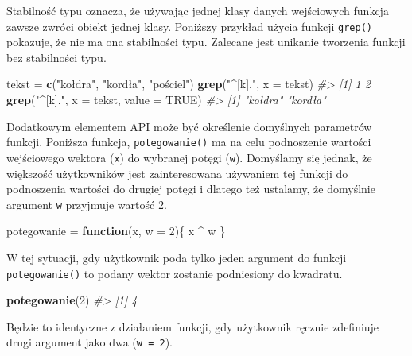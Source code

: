 \documentclass[paper=6in:9in,pagesize=pdftex,headinclude=on,footinclude=on,10pt]{scrbook}
\newenvironment{Shaded}{\begin{snugshade}}{\end{snugshade}}
\newcommand{\CommentTok}[1]{\textcolor[rgb]{0.56,0.35,0.01}{\textit{#1}}}
\newcommand{\ControlFlowTok}[1]{\textcolor[rgb]{0.13,0.29,0.53}{\textbf{#1}}}
\newcommand{\DataTypeTok}[1]{\textcolor[rgb]{0.13,0.29,0.53}{#1}}
\newcommand{\DecValTok}[1]{\textcolor[rgb]{0.00,0.00,0.81}{#1}}
\newcommand{\KeywordTok}[1]{\textcolor[rgb]{0.13,0.29,0.53}{\textbf{#1}}}
\newcommand{\NormalTok}[1]{#1}
\newcommand{\OperatorTok}[1]{\textcolor[rgb]{0.81,0.36,0.00}{\textbf{#1}}}
\newcommand{\OtherTok}[1]{\textcolor[rgb]{0.56,0.35,0.01}{#1}}
\newcommand{\StringTok}[1]{\textcolor[rgb]{0.31,0.60,0.02}{#1}}
\begin{document}
Stabilność typu oznacza, że używając jednej klasy danych wejściowych funkcja zawsze zwróci obiekt jednej klasy.
Poniższy przykład użycia funkcji \texttt{grep()} pokazuje, że nie ma ona stabilności typu.
Zalecane jest unikanie tworzenia funkcji bez stabilności typu.

\begin{Shaded}
\begin{Highlighting}[]
\NormalTok{tekst =}\StringTok{ }\KeywordTok{c}\NormalTok{(}\StringTok{"kołdra"}\NormalTok{, }\StringTok{"kordła"}\NormalTok{, }\StringTok{"pościel"}\NormalTok{)}
\KeywordTok{grep}\NormalTok{(}\StringTok{"^[k]."}\NormalTok{, }\DataTypeTok{x =}\NormalTok{ tekst)}
\CommentTok{#> [1] 1 2}
\KeywordTok{grep}\NormalTok{(}\StringTok{"^[k]."}\NormalTok{, }\DataTypeTok{x =}\NormalTok{ tekst, }\DataTypeTok{value =} \OtherTok{TRUE}\NormalTok{)}
\CommentTok{#> [1] "kołdra" "kordła"}
\end{Highlighting}
\end{Shaded}

Dodatkowym elementem API może być określenie domyślnych parametrów funkcji.
Poniższa funkcja, \texttt{potegowanie()} ma na celu podnoszenie wartości wejściowego wektora (\texttt{x}) do wybranej potęgi (\texttt{w}).
Domyślamy się jednak, że większość użytkowników jest zainteresowana używaniem tej funkcji do podnoszenia wartości do drugiej potęgi i dlatego też ustalamy, że domyślnie argument \texttt{w} przyjmuje wartość 2.

\begin{Shaded}
\begin{Highlighting}[]
\NormalTok{potegowanie =}\StringTok{ }\ControlFlowTok{function}\NormalTok{(x, }\DataTypeTok{w =} \DecValTok{2}\NormalTok{)\{}
\NormalTok{  x }\OperatorTok{^}\StringTok{ }\NormalTok{w}
\NormalTok{\}}
\end{Highlighting}
\end{Shaded}

W tej sytuacji, gdy użytkownik poda tylko jeden argument do funkcji \texttt{potegowanie()} to podany wektor zostanie podniesiony do kwadratu.

\begin{Shaded}
\begin{Highlighting}[]
\KeywordTok{potegowanie}\NormalTok{(}\DecValTok{2}\NormalTok{)}
\CommentTok{#> [1] 4}
\end{Highlighting}
\end{Shaded}

Będzie to identyczne z działaniem funkcji, gdy użytkownik ręcznie zdefiniuje drugi argument jako dwa (\texttt{w\ =\ 2}).
\end{document}
